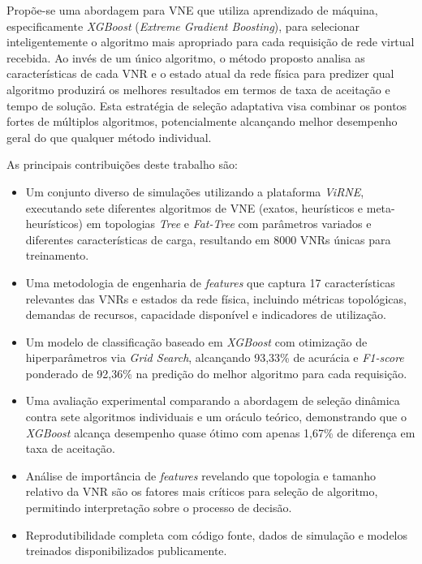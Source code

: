 \documentclass[conference]{IEEEtran}
\begin{document}
Propõe-se uma abordagem para VNE que utiliza aprendizado de máquina, especificamente \textit{XGBoost} (\textit{Extreme Gradient Boosting}), para selecionar inteligentemente o algoritmo mais apropriado para cada requisição de rede virtual recebida. Ao invés de um único algoritmo, o método proposto analisa as características de cada VNR e o estado atual da rede física para predizer qual algoritmo produzirá os melhores resultados em termos de taxa de aceitação e tempo de solução. Esta estratégia de seleção adaptativa visa combinar os pontos fortes de múltiplos algoritmos, potencialmente alcançando melhor desempenho geral do que qualquer método individual.

As principais contribuições deste trabalho são:

\begin{itemize}
    \item Um conjunto diverso de simulações utilizando a plataforma \textit{ViRNE}, executando sete diferentes algoritmos de VNE (exatos, heurísticos e meta-heurísticos) em topologias \textit{Tree} e \textit{Fat-Tree} com parâmetros variados e diferentes características de carga, resultando em 8000 VNRs únicas para treinamento.

    \item Uma metodologia de engenharia de \textit{features} que captura 17 características relevantes das VNRs e estados da rede física, incluindo métricas topológicas, demandas de recursos, capacidade disponível e indicadores de utilização.

    \item Um modelo de classificação baseado em \textit{XGBoost} com otimização de hiperparâmetros via \textit{Grid Search}, alcançando 93,33\% de acurácia e \textit{F1-score} ponderado de 92,36\% na predição do melhor algoritmo para cada requisição.

    \item Uma avaliação experimental comparando a abordagem de seleção dinâmica contra sete algoritmos individuais e um oráculo teórico, demonstrando que o \textit{XGBoost} alcança desempenho quase ótimo com apenas 1,67\% de diferença em taxa de aceitação.

    \item Análise de importância de \textit{features} revelando que topologia e tamanho relativo da VNR são os fatores mais críticos para seleção de algoritmo, permitindo interpretação sobre o processo de decisão.

    \item Reprodutibilidade completa com código fonte, dados de simulação e modelos treinados disponibilizados publicamente.
\end{itemize}
\end{document}
